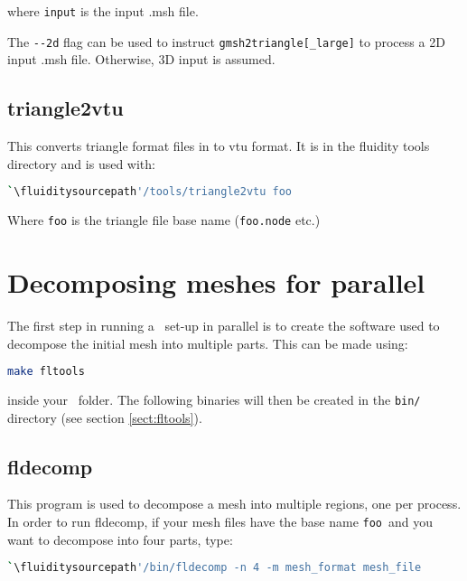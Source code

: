 where \lstinline[language = Bash]*input* is the input .msh file.

The \lstinline[language = Bash]+--2d+ flag can be used to instruct \lstinline+gmsh2triangle[_large]+
to process a 2D input .msh file. Otherwise, 3D input is assumed.

\subsection{triangle2vtu}
This converts triangle format files in to vtu format. It is in the fluidity tools directory and is used with:

\begin{lstlisting}[language = Bash]
`\fluiditysourcepath'/tools/triangle2vtu foo
\end{lstlisting}

Where \lstinline+foo+ is the triangle file base name (\lstinline+foo.node+ etc.)

\section{Decomposing meshes for parallel}
\label{decomp_meshes_parallel}

The first step in running a \fluidity\ set-up in parallel is to create the software
used to decompose the initial mesh into multiple parts. This can be made using:
\begin{lstlisting}[language=bash]
make fltools
\end{lstlisting}
inside your \fluidity\ folder. The following binaries will then be created in the \lstinline+bin/+ directory (see section \ref{sect:fltools}).



\subsection{fldecomp}
\label{mesh!meshing tools!fldecomp}
This program is used to decompose a mesh into multiple regions, one per
process. In order to run fldecomp, if your mesh files have the base name
\lstinline{foo}\ and you want to decompose into four parts, type:
\begin{lstlisting}[language = Bash]
`\fluiditysourcepath'/bin/fldecomp -n 4 -m mesh_format mesh_file
\end{lstlisting}

